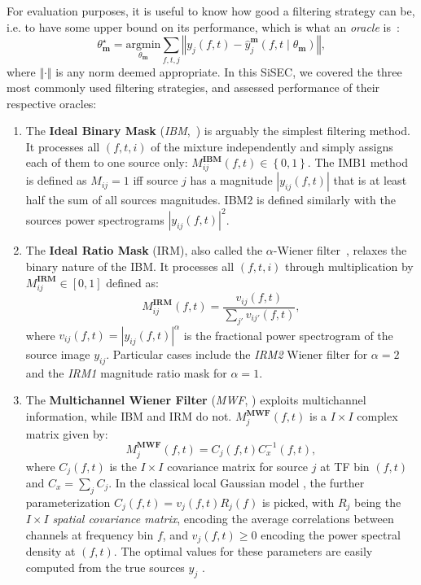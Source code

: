 \documentclass{llncs}
\newcommand{\sboxed}[1]{\textbf{#1}}
\newcommand{\thet}[1]{\theta_{\sboxed{#1}}}
\newcommand{\ft}{\left(f,t\right)}
\newcommand{\ftt}[1]{\left(f,t\mid\thet{#1}\right)}
\begin{document}
For evaluation purposes, it is useful to know how good a filtering strategy can be, i.e. to have some upper bound on its performance, which is what an \textit{oracle} is~\cite{vincent2007oracle}:
\begin{equation}
  \thet{m}^{\star}=\underset{\thet{m}}{\text{argmin}}\sum_{f,t,j}\left\Vert y_{j}\ft-\hat{y}_{j}^{\sboxed{m}}\ftt{m}\right\Vert,
  \end{equation}
where $\Vert\cdot\Vert$ is any norm deemed appropriate. In this SiSEC, we covered the three most commonly used filtering strategies, and assessed performance of their respective oracles:
\begin{enumerate}
  \item The \textbf{Ideal Binary Mask} (\textit{IBM},~\cite{wang2005}) is arguably the simplest filtering method. It processes all $\left(f,t,i\right)$ of the mixture independently and simply assigns each of them to one source only:   $M_{ij}^\sboxed{IBM}\ft\in\left\{0,1\right\}$. The IMB1 method is defined as $M_{ij}=1$ iff source $j$ has a magnitude $\left|y_{ij}(f,t)\right|$ that is at least half the sum of all sources magnitudes. IBM2 is defined similarly with the sources power spectrograms $\left|y_{ij}(f,t)\right|^2$.
  \item The \textbf{Ideal Ratio Mask} (IRM), also called the $\alpha$-Wiener filter~\cite{liutkus15}, relaxes the binary nature of the IBM. It processes all $\left(f,t,i\right)$ through multiplication by $M_{ij}^\sboxed{IRM}\in\left[0,1\right]$ defined as:
  \begin{equation}
    M^{\sboxed{IRM}}_{ij}\ft=\frac{v_{ij}\ft}{\sum_{j'}v_{ij'}\ft},
  \end{equation}
where $v_{ij}\ft=\left|y_{ij}\ft\right|^\alpha$ is the fractional power spectrogram of the source image $y_{ij}$. Particular cases include the \textit{IRM2} Wiener filter for $\alpha=2$ and the \textit{IRM1} magnitude ratio mask for $\alpha=1$.
  \item The \textbf{Multichannel Wiener Filter} (\textit{MWF}, \cite{duong10}) exploits multichannel information, while IBM and IRM do not. $M^{\sboxed{MWF}}_{j}\ft$ is a $I\times I$ complex matrix given by:
  \begin{equation}
    M_{j}^{\sboxed{MWF}}\ft=C_{j}\ft C_{x}^{-1}\ft,
  \end{equation}
where $C_j\ft$ is the $I\times I$ covariance matrix for source $j$ at TF bin $\ft$ and $C_x=\sum_j C_j$. In the classical local Gaussian model \cite{duong10}, the further parameterization $C_j\ft=v_j\ft R_j\left(f\right)$ is picked, with $R_j$ being the $I\times I$ \textit{spatial covariance matrix}, encoding the average correlations between channels at frequency bin $f$, and $v_j\ft\geq0$ encoding the power spectral density at $\ft$. The optimal values for these parameters are easily computed from the true sources $y_j$ \cite{liutkus2013}.
\end{enumerate}
\end{document}
